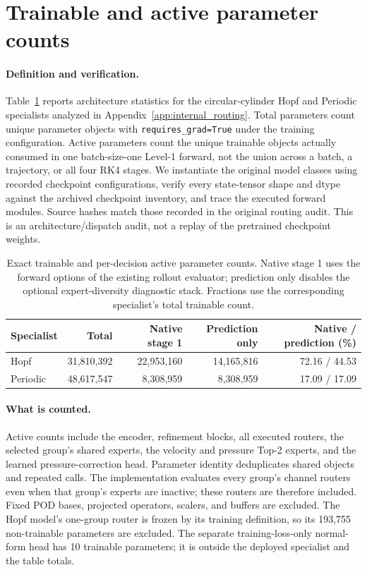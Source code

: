 \section{Trainable and active parameter counts}
\label{app:parameter_counts}

\paragraph{Definition and verification.}
Table~\ref{tab:parameter_counts} reports architecture statistics for the
circular-cylinder Hopf and Periodic specialists analyzed in
Appendix~\ref{app:internal_routing}. Total parameters count unique parameter
objects with \texttt{requires\_grad=True} under the training configuration.
Active parameters count the unique trainable objects actually consumed in one
batch-size-one Level-1 forward, not the union across a batch, a trajectory, or
all four RK4 stages. We instantiate the original model classes using recorded
checkpoint configurations, verify every state-tensor shape and dtype against
the archived checkpoint inventory, and trace the executed forward modules.
Source hashes match those recorded in the original routing audit. This is an
architecture/dispatch audit, not a replay of the pretrained checkpoint weights.

\begin{table}[htbp]
\centering
\caption{Exact trainable and per-decision active parameter counts. Native
stage 1 uses the forward options of the existing rollout evaluator; prediction
only disables the optional expert-diversity diagnostic stack. Fractions use
the corresponding specialist's total trainable count.}
\label{tab:parameter_counts}
\small
\setlength{\tabcolsep}{5pt}
\begin{tabular}{@{}lrrrr@{}}
\toprule
Specialist & Total & Native stage 1 & Prediction only & Native / prediction (\%) \\
\midrule
Hopf & 31,810,392 & 22,953,160 & 14,165,816 & 72.16 / 44.53 \\
Periodic & 48,617,547 & 8,308,959 & 8,308,959 & 17.09 / 17.09 \\
\bottomrule
\end{tabular}
\end{table}

\paragraph{What is counted.}
Active counts include the encoder, refinement blocks, all executed routers,
the selected group's shared experts, the velocity and pressure Top-2 experts,
and the learned pressure-correction head. Parameter identity deduplicates
shared objects and repeated calls. The implementation evaluates every group's
channel routers even when that group's experts are inactive; these routers
are therefore included. Fixed POD bases, projected operators, scalers, and
buffers are excluded. The Hopf model's one-group router is frozen by its
training definition, so its 193,755 non-trainable parameters are excluded.
The separate training-loss-only normal-form head has 10 trainable parameters;
it is outside the deployed specialist and the table totals.


